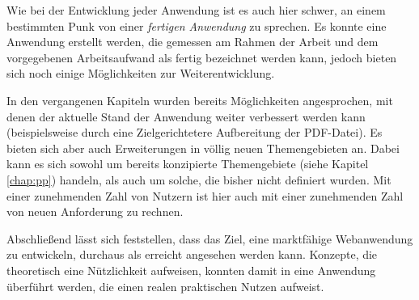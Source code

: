 Wie bei der Entwicklung jeder Anwendung ist es auch hier schwer, an einem bestimmten Punk von einer \textit{fertigen Anwendung} zu sprechen. Es konnte eine Anwendung erstellt werden, die gemessen am Rahmen der Arbeit und dem vorgegebenen Arbeitsaufwand als fertig bezeichnet werden kann, jedoch bieten sich noch einige Möglichkeiten zur Weiterentwicklung.

In den vergangenen Kapiteln wurden bereits Möglichkeiten angesprochen, mit denen der aktuelle Stand der Anwendung weiter verbessert werden kann (beispielsweise durch eine Zielgerichtetere Aufbereitung der PDF-Datei).
Es bieten sich aber auch Erweiterungen in völlig neuen Themengebieten an. Dabei kann es sich sowohl um bereits konzipierte Themengebiete (siehe Kapitel \ref{chap:pp}) handeln, als auch um solche, die bisher nicht definiert wurden. Mit einer zunehmenden Zahl von Nutzern ist hier auch mit einer zunehmenden Zahl von neuen Anforderung zu rechnen.

Abschließend lässt sich feststellen, dass das Ziel, eine marktfähige Webanwendung zu entwickeln, durchaus als erreicht angesehen werden kann. Konzepte, die theoretisch eine Nützlichkeit aufweisen, konnten damit in eine Anwendung überführt werden, die einen realen praktischen Nutzen aufweist.
